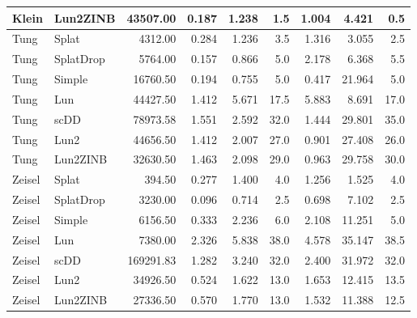 \begin{table}
\begin{tabular}[t]{l l r r r r r r r}
Klein & Lun2ZINB & 43507.00 & 0.187 & 1.238 & 1.5 & 1.004 & 4.421 & 0.5\\
\hline
Tung & Splat & 4312.00 & 0.284 & 1.236 & 3.5 & 1.316 & 3.055 & 2.5\\
Tung & SplatDrop & 5764.00 & 0.157 & 0.866 & 5.0 & 2.178 & 6.368 & 5.5\\
Tung & Simple & 16760.50 & 0.194 & 0.755 & 5.0 & 0.417 & 21.964 & 5.0\\
Tung & Lun & 44427.50 & 1.412 & 5.671 & 17.5 & 5.883 & 8.691 & 17.0\\
Tung & scDD & 78973.58 & 1.551 & 2.592 & 32.0 & 1.444 & 29.801 & 35.0\\
Tung & Lun2 & 44656.50 & 1.412 & 2.007 & 27.0 & 0.901 & 27.408 & 26.0\\
Tung & Lun2ZINB & 32630.50 & 1.463 & 2.098 & 29.0 & 0.963 & 29.758 & 30.0\\
\hline
Zeisel & Splat & 394.50 & 0.277 & 1.400 & 4.0 & 1.256 & 1.525 & 4.0\\
Zeisel & SplatDrop & 3230.00 & 0.096 & 0.714 & 2.5 & 0.698 & 7.102 & 2.5\\
Zeisel & Simple & 6156.50 & 0.333 & 2.236 & 6.0 & 2.108 & 11.251 & 5.0\\
Zeisel & Lun & 7380.00 & 2.326 & 5.838 & 38.0 & 4.578 & 35.147 & 38.5\\
Zeisel & scDD & 169291.83 & 1.282 & 3.240 & 32.0 & 2.400 & 31.972 & 32.0\\
Zeisel & Lun2 & 34926.50 & 0.524 & 1.622 & 13.0 & 1.653 & 12.415 & 13.5\\
Zeisel & Lun2ZINB & 27336.50 & 0.570 & 1.770 & 13.0 & 1.532 & 11.388 & 12.5\\
\hline
\end{tabular}
\end{table}